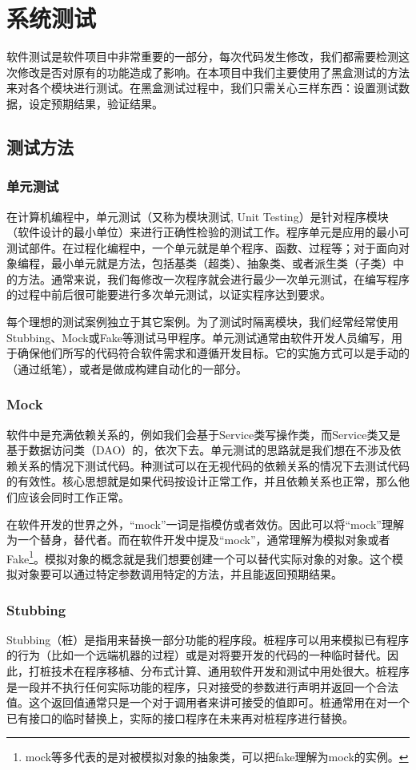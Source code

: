 
\chapter{系统测试}
软件测试是软件项目中非常重要的一部分，每次代码发生修改，我们都需要检测这次修改是否对原有的功能造成了影响。在本项目中我们主要使用了黑盒测试的方法来对各个模块进行测试。在黑盒测试过程中，我们只需关心三样东西：设置测试数据，设定预期结果，验证结果。

\section{测试方法}
\subsection{单元测试}
在计算机编程中，单元测试（又称为模块测试, Unit Testing）是针对程序模块（软件设计的最小单位）来进行正确性检验的测试工作。程序单元是应用的最小可测试部件。在过程化编程中，一个单元就是单个程序、函数、过程等；对于面向对象编程，最小单元就是方法，包括基类（超类）、抽象类、或者派生类（子类）中的方法。通常来说，我们每修改一次程序就会进行最少一次单元测试，在编写程序的过程中前后很可能要进行多次单元测试，以证实程序达到要求。

每个理想的测试案例独立于其它案例。为了测试时隔离模块，我们经常经常使用Stubbing、Mock或Fake等测试马甲程序。单元测试通常由软件开发人员编写，用于确保他们所写的代码符合软件需求和遵循开发目标。它的实施方式可以是手动的（通过纸笔），或者是做成构建自动化的一部分。

\subsection{Mock}
软件中是充满依赖关系的，例如我们会基于Service类写操作类，而Service类又是基于数据访问类（DAO）的，依次下去。单元测试的思路就是我们想在不涉及依赖关系的情况下测试代码。种测试可以在无视代码的依赖关系的情况下去测试代码的有效性。核心思想就是如果代码按设计正常工作，并且依赖关系也正常，那么他们应该会同时工作正常。

在软件开发的世界之外，``mock''一词是指模仿或者效仿。因此可以将``mock''理解为一个替身，替代者。而在软件开发中提及``mock''，通常理解为模拟对象或者Fake\footnote{mock等多代表的是对被模拟对象的抽象类，可以把fake理解为mock的实例。}。模拟对象的概念就是我们想要创建一个可以替代实际对象的对象。这个模拟对象要可以通过特定参数调用特定的方法，并且能返回预期结果。

\subsection{Stubbing}
Stubbing（桩）是指用来替换一部分功能的程序段。桩程序可以用来模拟已有程序的行为（比如一个远端机器的过程）或是对将要开发的代码的一种临时替代。因此，打桩技术在程序移植、分布式计算、通用软件开发和测试中用处很大。桩程序是一段并不执行任何实际功能的程序，只对接受的参数进行声明并返回一个合法值。这个返回值通常只是一个对于调用者来讲可接受的值即可。桩通常用在对一个已有接口的临时替换上，实际的接口程序在未来再对桩程序进行替换。


